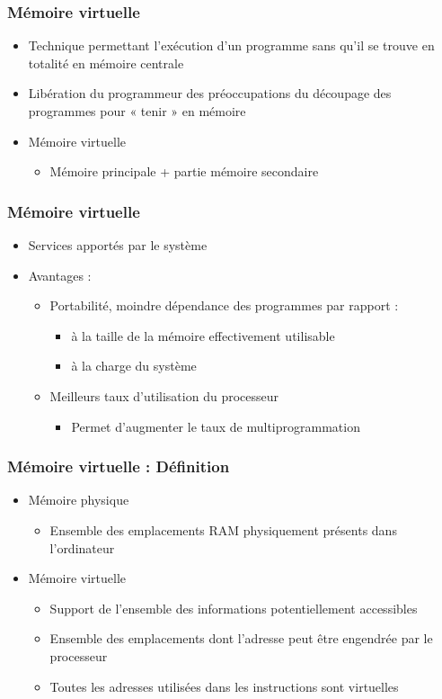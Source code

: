 \begin{frame}
\frametitle{Mémoire virtuelle}
\begin{itemize}
\item Technique permettant l'exécution d'un programme sans qu'il se trouve en totalité en mémoire centrale
\item Libération du programmeur des préoccupations du découpage des programmes pour « tenir » en mémoire
\item Mémoire virtuelle
\begin{itemize}
\item Mémoire principale + partie mémoire secondaire
\end{itemize}
\end{itemize}
\end{frame}


\begin{frame}
\frametitle{Mémoire virtuelle}
\begin{itemize}
\item Services apportés par le système
\item Avantages :
\begin{itemize}
\item Portabilité, moindre dépendance des programmes par rapport :
\begin{itemize}
\item à la taille de la mémoire effectivement utilisable
\item à la charge du système
\end{itemize}
\item Meilleurs taux d'utilisation du processeur
\begin{itemize}
\item Permet d'augmenter le taux de multiprogrammation
\end{itemize}
\end{itemize}
\end{itemize}
\end{frame}

\begin{frame}
\frametitle{Mémoire virtuelle : Définition}
\begin{itemize}
\item Mémoire physique
\begin{itemize}
\item Ensemble des emplacements RAM physiquement présents dans l'ordinateur
\end{itemize}
\item Mémoire virtuelle
\begin{itemize}
\item Support de l'ensemble des informations potentiellement accessibles
\item Ensemble des emplacements dont l'adresse peut être engendrée par le processeur
\item Toutes les adresses utilisées dans les instructions sont virtuelles
\end{itemize}
\end{itemize}
\end{frame}


